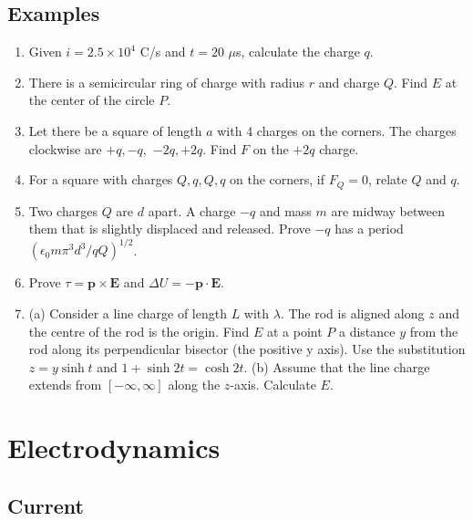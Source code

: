 \documentclass{tufte-book}
\renewcommand{\b}{\mathbf}
\begin{document}
\section{Examples}
\begin{fullwidth}
\begin{enumerate}
    \item Given $i = 2.5 \times 10^4$ C/s and $t = 20$ $\mu$s, calculate the charge $q$.
    \item There is a semicircular ring of charge with radius $r$ and charge $Q$. Find $E$ at the center of the circle $P$.
    \item Let there be a square of length $a$ with 4 charges on the corners. The charges clockwise are $+q, -q,$ $-2q, +2q$. Find $F$ on the $+2q$ charge.
    \item For a square with charges $Q, q, Q, q$ on the corners, if $F_Q = 0$, relate $Q$ and $q$.
    \item Two charges $Q$ are $d$ apart. A charge $-q$ and mass $m$ are midway between them that is slightly displaced and released. Prove $-q$ has a period $(\epsilon_0 m \pi^3 d^3 / qQ)^{1/2}$.
    \item Prove $\tau = \b p \times \b E$ and $\Delta U = - \b p \cdot \b E$.
    \item (a) Consider a line charge of length $L$ with $\lambda$. The rod is aligned along $z$ and the centre of the rod is the origin. Find $E$ at a point $P$ a distance $y$ from the rod along its perpendicular bisector (the positive y axis). Use the substitution $z = y \sinh t$ and $1+\sinh2t=\cosh2t$. (b) Assume that the line charge extends from $[-\infty, \infty]$ along the $z$-axis. Calculate $E$.
\end{enumerate}
\end{fullwidth}



\chapter{Electrodynamics}

\section{Current}
\end{document}

